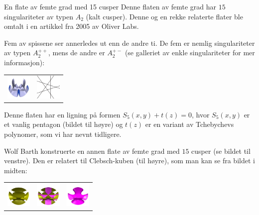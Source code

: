 \begin{surferPage}{En flate av femte grad med 15 cusper}
  Denne flaten av femte grad har $15$ singulariteter av typen $A_2$ (kalt cusper). 
  Denne og en rekke relaterte flater ble omtalt i en artikkel fra 2005 av Oliver Labs. 

Fem av spissene ser annerledes ut enn de andre ti. De fem er nemlig singulariteter av 
typen $A_2^{++}$, mens de andre er $A_2^{+-}$ (se galleriet av enkle singulariteter for mer informasjon): 

     \vspace*{-0.3em}
    \begin{center}
      \begin{tabular}{c@{\qquad}c}
        \includegraphics[height=1.2cm]{./../../common/images/dessins_quint_15a2}
        &
        \includegraphics[height=1.2cm]{./../../common/images/rp5.pdf}
      \end{tabular}
    \end{center}
    \vspace*{-0.3em}    
    
	Denne flaten har en ligning på formen $S_5(x,y) + t(z)=0$, hvor $S_5(x,y)$ er et vanlig pentagon 
	(bildet til høyre) og $t(z)$ er en variant av Tchebychevs polynomer, som vi har nevnt tidligere. 
    
	
	Wolf Barth konstruerte en annen flate av femte grad med $15$ cusper (se bildet til venstre). 
	Den er relatert til Clebsch-kuben (til høyre), som man kan se fra bildet i midten:


    \vspace*{-0.3em}
    \begin{center}
      \begin{tabular}{c@{\quad}c@{\quad}c}
        \includegraphics[height=1.2cm]{./../../common/images/barthquintic_green}
        &
        \includegraphics[height=1.2cm]{./../../common/images/barthquintic_clebschcubic}
        &
        \includegraphics[height=1.2cm]{./../../common/images/clebschcubic_pink}
      \end{tabular}
    \end{center}
    \vspace*{-0.3em}
\end{surferPage}
